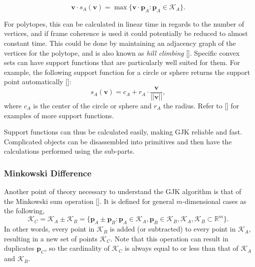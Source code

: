 \begin{equation}
\textbf{v} \cdot s_A(\textbf{v}) = \max\{\textbf{v}\cdot \textbf{p}_A : \textbf{p}_A \in \mathcal{K}_A\}.
\end{equation}

For polytopes, this can be calculated in linear time in regards to the number of vertices, and if frame coherence is used it could potentially be reduced to almost constant time. This could be done by maintaining an adjacency graph of the vertices for the polytope, and is also known as \textit{hill climbing} [\citeauthor{VanDenBergen1999}]. Specific convex sets can have support functions that are particularly well suited for them. For example, the following support function for a circle or sphere returns the support point automatically [\citeauthor{Lindemann2009}]:
\begin{equation}
s_A(\textbf{v}) = c_A + r_A\cdot\frac{\textbf{v}}{||\textbf{v}||},
\end{equation}
where $c_A$ is the center of the circle or sphere and $r_A$ the radius. Refer to [\citeauthor{VanDenBergen1999}] for examples of more support functions.

Support functions can thus be calculated easily, making \gls{GJK} reliable and fast. Complicated objects can be disassembled into primitives and then have the calculations performed using the sub-parts.

\subsubsection{Minkowski Difference}

Another point of theory necessary to understand the \gls{GJK} algorithm is that of the Minkowski sum operation [\citeauthor{Gilbert1987}]. It is defined for general $m$-dimensional cases as the following,
\begin{equation}
\mathcal{K}_C = \mathcal{K}_A \pm \mathcal{K}_B = \{\textbf{p}_A \pm \textbf{p}_B : \textbf{p}_A \in \mathcal{K}_A, \textbf{p}_B \in \mathcal{K}_B, \mathcal{K}_A, \mathcal{K}_B \subset \mathbb{R}^m \}.
\end{equation}
In other words, every point in $\mathcal{K}_B$ is added (or subtracted) to every point in $\mathcal{K}_A$, resulting in a new set of points $\mathcal{K}_C$. Note that this operation can result in duplicates $\textbf{p}_C$, so the cardinality of $\mathcal{K}_C$ is always equal to or less than that of $\mathcal{K}_A$ and $\mathcal{K}_B$.

